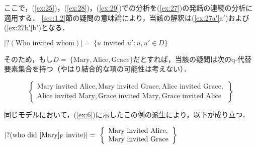 \documentclass{goken}
\newcommand{\ori}[1]{\noindent\textcolor[gray]{0.7}{\fontsize{8pt}{8pt}\selectfont{\textsf{(p.~#1)}}} }
\begin{document}
\noindent
ここで，(\ref{ex:25})，(\ref{ex:28})，(\ref{ex:29})での分析を(\ref{ex:27})の発話の連続の分析に適用する．
\ref{sec:1.2}節の疑問の意味論により，当該の解釈は(\ref{ex:27a'}a$'$)および(\ref{ex:27b'}b$'$)となる．%

\setcounter{exx}{26}
\begin{exe}
  \ex\label{ex:27'}
	\begin{xlist}
		\label{ex:27a'} $|?(\text{Who invited whom})| =\ \{u\text{ invited }u': u, u' \in D\}$
  \end{xlist}
\end{exe}

\noindent
そのため，もし$D =\ \{\text{Mary}, \text{Alice}, \text{Grace}\}$だとすれば，当該の疑問は次のq-代替要素集合を持つ（やはり結合的な項の可能性は考えない）．

\[
	\left\{
  \begin{array}{l}
			\text{Mary invited Alice}, \text{Mary invited Grace}, \text{Alice invited Grace},\\
      \text{Alice invited Mary}, \text{Grace invited Mary}, \text{Grace invited Alice}
	\end{array}
  \right\}
\]

\ori{34}
同じモデルにおいて，(\ref{ex:6})に示したこの例の派生により，以下が成り立つ．

\setcounter{exx}{26}
\begin{exe}
  \ex\label{ex:27''}
	\begin{xlist}
		\label{ex:27b'} $|?(\text{who did [Mary]\textsubscript{F} invite})| =\
    \left\{
    \begin{array}{l}
	\text{Mary invited Alice},\\
	\text{Mary invited Grace}
  	\end{array}
    \right\}$
  \end{xlist}
\end{exe}
\end{document}
